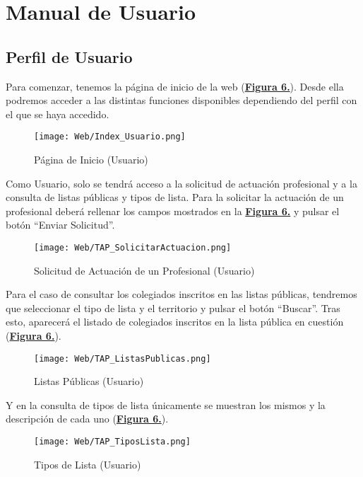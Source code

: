 \chapter{Manual de Usuario}

\section{Perfil de Usuario}
\addtocounter{figura_manual}{1} Para comenzar, tenemos la página de inicio de la web (\textbf{\hyperref[fig:Web_Index_Usuario]{Figura 6.}}). Desde ella podremos acceder a las distintas funciones disponibles dependiendo del perfil con el que se haya accedido.
\begin{figure}[!htbp]
  \centering
  \texttt{[image: Web/Index\_Usuario.png]}
  \caption{Página de Inicio (Usuario)}
  \label{fig:Web_Index_Usuario}
\end{figure}
\FloatBarrier

\addtocounter{figura_manual}{1} Como Usuario, solo se tendrá acceso a la solicitud de actuación profesional y a la consulta de listas públicas y tipos de lista. Para la solicitar la actuación de un profesional deberá rellenar los campos mostrados en la \textbf{\hyperref[fig:Web_TAP_SolicitarActuacion]{Figura 6.}} y pulsar el botón ``Enviar Solicitud''.
\begin{figure}[!htbp]
  \centering
  \texttt{[image: Web/TAP\_SolicitarActuacion.png]}
  \caption{Solicitud de Actuación de un Profesional (Usuario)}
  \label{fig:Web_TAP_SolicitarActuacion}
\end{figure}
\FloatBarrier

\addtocounter{figura_manual}{1} Para el caso de consultar los colegiados inscritos en las listas públicas, tendremos que seleccionar el tipo de lista y el territorio y pulsar el botón ``Buscar''. Tras esto, aparecerá el listado de colegiados inscritos en la lista pública en cuestión (\textbf{\hyperref[fig:Web_TAP_ListasPublicas]{Figura 6.}}).
\begin{figure}[!htbp]
  \centering
  \texttt{[image: Web/TAP\_ListasPublicas.png]}
  \caption{Listas Públicas (Usuario)}
  \label{fig:Web_TAP_ListasPublicas}
\end{figure}
\FloatBarrier

\addtocounter{figura_manual}{1} Y en la consulta de tipos de lista únicamente se muestran los mismos y la descripción de cada uno (\textbf{\hyperref[fig:Web_TAP_TiposLista]{Figura 6.}}).
\begin{figure}[!htbp]
  \centering
  \texttt{[image: Web/TAP\_TiposLista.png]}
  \caption{Tipos de Lista (Usuario)}
  \label{fig:Web_TAP_TiposLista}
\end{figure}
\FloatBarrier



